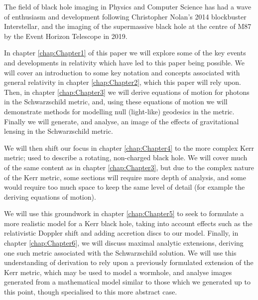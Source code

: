 \documentclass[oneside,openright,frontopenright, singlespacing]{dmathesis}
\begin{document}
%
%
%
%
\begin{introduction}

	The field of black hole imaging in Physics and Computer Science has had a wave of enthusiasm and development following Christopher Nolan’s 2014 blockbuster Interstellar\cite{Interstellar}, and the imaging of the supermassive black hole at the centre of M87 by the Event Horizon Telescope in 2019\cite{event2019first}.

\vspace{1em}
	 In chapter \ref{chap:Chapter1} of this paper we will explore some of the key events and developments in relativity which have led to this paper being possible. We will cover an introduction to some key notation and concepts associated with general relativity in chapter \ref{chap:Chapter2}, which this paper will rely upon. Then, in chapter \ref{chap:Chapter3} we will derive equations of motion for photons in the Schwarzschild metric, and, using these equations of motion we will demonstrate methods for modelling null (light-like) geodesics in the metric. Finally we will generate, and analyse, an image of the effects of gravitational lensing in the Schwarzschild metric.

\vspace{1em}
	We will then shift our focus in chapter \ref{chap:Chapter4} to the more complex Kerr metric; used to describe a rotating, non-charged black hole. We will cover much of the same content as in chapter \ref{chap:Chapter3}, but due to the complex nature of the Kerr metric, some sections will require more depth of analysis, and some would require too much space to keep the same level of detail (for example the deriving equations of motion).

\vspace{1em}
	We will use this groundwork in chapter \ref{chap:Chapter5} to seek to formulate a more realistic model for a Kerr black hole, taking into account effects such as the relativistic Doppler shift and adding accretion discs to our model. Finally, in chapter \ref{chap:Chapter6}, we will discuss maximal analytic extensions, deriving one such metric associated with the Schwarzschild solution. We will use this understanding of derivation to rely upon a previously formulated extension of the Kerr metric, which may be used to model a wormhole, and analyse images generated from a mathematical model similar to those which we generated up to this point, though specialised to this more abstract case. 

\vspace{1em}
	

\end{introduction}
\end{document}
